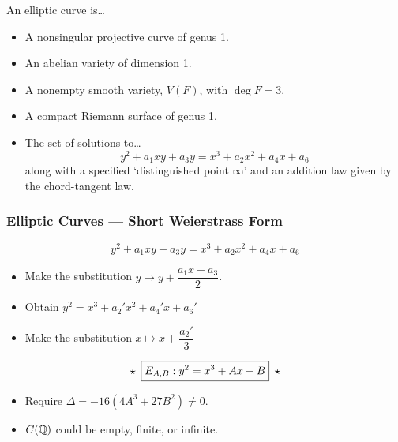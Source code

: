 
\begin{frame}[plain] 
\end{frame}



\begin{frame}[plain]
\begin{dfn}
An elliptic curve is\dots
\begin{itemize}
\item A nonsingular projective curve of genus 1.
\item An abelian variety of dimension 1.
\item A nonempty smooth variety, $V(F)$, with $\deg F=3$.
\item A compact Riemann surface of genus 1.
\item The set of solutions to\dots
	\[
	y^2 + a_1 xy + a_3y = x^3 + a_2 x^2 + a_4 x + a_6
	\]
along with a specified `distinguished point $\infty$' and an addition law given by the chord-tangent law.
\end{itemize}
\end{dfn}
\end{frame}



\begin{frame}[plain] \frametitle{Elliptic Curves --- Short Weierstrass Form}
	\[
	y^2 + a_1 xy + a_3y = x^3 + a_2 x^2 + a_4 x + a_6
	\] \pspace 

\begin{itemize}
\item Make the substitution $y \mapsto y + \dfrac{a_1 x+a_3}{2}$.
\item Obtain $y^2= x^3+ a_2' x^2 + a_4' x + a_6'$
\item Make the substitution $x \mapsto x + \dfrac{a_2'}{3}$
\end{itemize} \pspace 
	\[
	\star \enskip \boxed{E_{A,B}: y^2 = x^3 + Ax + B} \enskip \star
	\] \pspace

\begin{itemize}
\item Require $\Delta= -16(4A^3+27B^2) \neq 0$.
\item $C(\mathbb{Q})$ could be empty, finite, or infinite. 
\end{itemize}
\end{frame}



